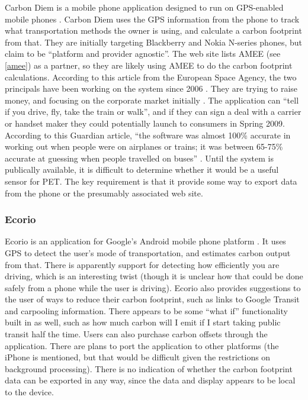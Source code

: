 Carbon Diem is a mobile phone application designed to run on GPS-enabled mobile phones \cite{Carbon-Diem-website}. Carbon Diem uses the GPS information from the phone to track what transportation methods the owner is using, and calculate a carbon footprint from that. They are initially targeting Blackberry and Nokia N-series phones, but claim to be ``platform and provider agnostic''. The web site lists AMEE (see \autoref{amee}) as a partner, so they are likely using AMEE to do the carbon footprint calculations. According to this article from the European Space Agency, the two principals have been working on the system since 2006 \cite{ESA-carbon-hero-2008}. They are trying to raise money, and focusing on the corporate market initially \cite{Fehrenbacher2008Carbon-Hero}. The application can ``tell if you drive, fly, take the train or walk'', and if they can sign a deal with a carrier or handset maker they could potentially launch to consumers in Spring 2009. According to this Guardian article, ``the software was almost 100\% accurate in working out when people were on airplanes or trains; it was between 65-75\% accurate at guessing when people travelled on buses'' \cite{Jha2008Carbon-Diem}. Until the system is publically available, it is difficult to determine whether it would be a useful sensor for PET. The key requirement is that it provide some way to export data from the phone or the presumably associated web site.

\subsubsection{Ecorio}

Ecorio is an application for Google's Android mobile phone platform \cite{Ecorio-website}. It uses GPS to detect the user's mode of transportation, and estimates carbon output from that. There is apparently support for detecting how efficiently you are driving, which is an interesting twist (though it is unclear how that could be done safely from a phone while the user is driving). Ecorio also provides suggestions to the user of ways to reduce their carbon footprint, such as links to Google Transit and carpooling information. There appears to be some ``what if'' functionality built in as well, such as how much carbon will I emit if I start taking public transit half the time. Users can also purchase carbon offsets through the application. There are plans to port the application to other platforms (the iPhone is mentioned, but that would be difficult given the restrictions on background processing). There is no indication of whether the carbon footprint data can be exported in any way, since the data and display appears to be local to the device.

